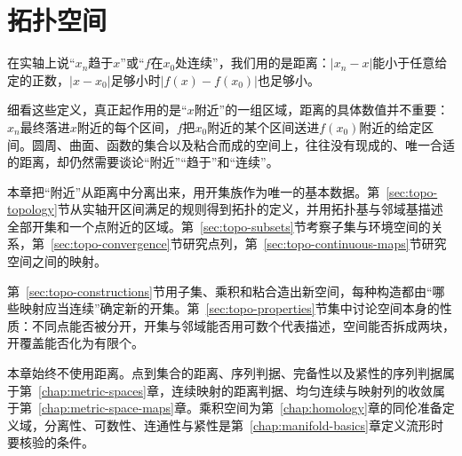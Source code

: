 \chapter{拓扑空间}
\label{chap:topological-spaces}

在实轴上说“$x_n$趋于$x$”或“$f$在$x_0$处连续”，我们用的是距离：$\lvert x_n-x\rvert$能小于任意给定的正数，$\lvert x-x_0\rvert$足够小时$\lvert f(x)-f(x_0)\rvert$也足够小。

细看这些定义，真正起作用的是“$x$附近”的一组区域，距离的具体数值并不重要：$x_n$最终落进$x$附近的每个区间，$f$把$x_0$附近的某个区间送进$f(x_0)$附近的给定区间。圆周、曲面、函数的集合以及粘合而成的空间上，往往没有现成的、唯一合适的距离，却仍然需要谈论“附近”“趋于”和“连续”。

本章把“附近”从距离中分离出来，用开集族作为唯一的基本数据。第~\ref{sec:topo-topology}节从实轴开区间满足的规则得到拓扑的定义，并用拓扑基与邻域基描述全部开集和一个点附近的区域。第~\ref{sec:topo-subsets}节考察子集与环境空间的关系，第~\ref{sec:topo-convergence}节研究点列，第~\ref{sec:topo-continuous-maps}节研究空间之间的映射。

第~\ref{sec:topo-constructions}节用子集、乘积和粘合造出新空间，每种构造都由“哪些映射应当连续”确定新的开集。第~\ref{sec:topo-properties}节集中讨论空间本身的性质：不同点能否被分开，开集与邻域能否用可数个代表描述，空间能否拆成两块，开覆盖能否化为有限个。

本章始终不使用距离。点到集合的距离、序列判据、完备性以及紧性的序列判据属于第~\ref{chap:metric-spaces}章，连续映射的距离判据、均匀连续与映射列的收敛属于第~\ref{chap:metric-space-maps}章。乘积空间为第~\ref{chap:homology}章的同伦准备定义域，分离性、可数性、连通性与紧性是第~\ref{chap:manifold-basics}章定义流形时要核验的条件。














